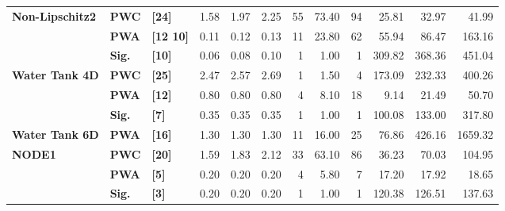 \begin{tabular}{@{} lll rrr rrr rrr @{}}
    \midrule
    \textbf{Non-Lipschitz2} & \textbf{PWC}      & \textbf{[24]}    & 1.58                                 & 1.97                      & 2.25                    & 55     & 73.40                     & 94     & 25.81  & 32.97                     & 41.99   \\
                            & \textbf{PWA}      & \textbf{[12 10]} & 0.11                                 & 0.12                      & 0.13                    & 11     & 23.80                     & 62     & 55.94  & 86.47                     & 163.16  \\
                            & \textbf{Sig.}     & \textbf{[10]}    & 0.06                                 & 0.08                      & 0.10                    & 1      & 1.00                      & 1      & 309.82 & 368.36                    & 451.04  \\
    \midrule
    \textbf{Water Tank 4D}  & \textbf{PWC}      & \textbf{[25]}    & 2.47                                 & 2.57                      & 2.69                    & 1      & 1.50                      & 4      & 173.09 & 232.33                    & 400.26  \\
                            & \textbf{PWA}      & \textbf{[12]}    & 0.80                                 & 0.80                      & 0.80                    & 4      & 8.10                      & 18     & 9.14   & 21.49                     & 50.70   \\
                            & \textbf{Sig.}     & \textbf{[7]}     & 0.35                                 & 0.35                      & 0.35                    & 1      & 1.00                      & 1      & 100.08 & 133.00                    & 317.80  \\
    \midrule
    \textbf{Water Tank 6D}  & \textbf{PWA}      & \textbf{[16]}    & 1.30                                 & 1.30                      & 1.30                    & 11     & 16.00                     & 25     & 76.86  & 426.16                    & 1659.32 \\
    \midrule
    \textbf{NODE1}          & \textbf{PWC}      & \textbf{[20]}    & 1.59                                 & 1.83                      & 2.12                    & 33     & 63.10                     & 86     & 36.23  & 70.03                     & 104.95  \\
                            & \textbf{PWA}      & \textbf{[5]}     & 0.20                                 & 0.20                      & 0.20                    & 4      & 5.80                      & 7      & 17.20  & 17.92                     & 18.65   \\
                            & \textbf{Sig.}     & \textbf{[3]}     & 0.20                                 & 0.20                      & 0.20                    & 1      & 1.00                      & 1      & 120.38 & 126.51                    & 137.63  \\
    \bottomrule
\end{tabular}
